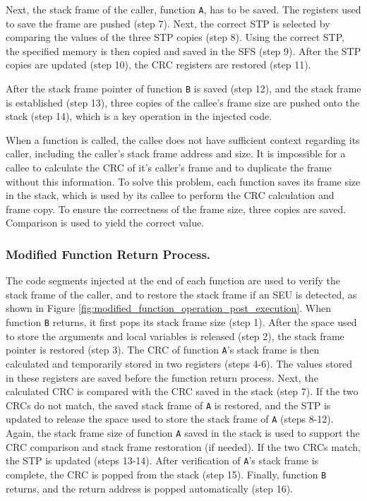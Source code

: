 Next, the stack frame of the caller, function \texttt{A}, has to be saved. The registers used to save the frame are pushed (step 7). Next, the correct STP is selected by comparing the values of the three STP copies (step 8). Using the correct STP, the specified memory is then copied and saved in the SFS (step 9). After the STP copies are updated (step 10), the CRC registers are restored (step 11).

After the stack frame pointer of function \texttt{B} is saved (step 12), and the stack frame is established (step 13), three copies of the callee's frame size are pushed onto the stack (step 14), which is a key operation in the injected code. 

When a function is called, the callee does not have sufficient context regarding its caller, including the caller's stack frame address and size. It is impossible for a callee to calculate the CRC of it's caller's frame and to duplicate the frame without this information. To solve this problem, each function saves its frame size in the stack, which is used by its callee to perform the CRC calculation and frame copy. To ensure the correctness of the frame size, three copies are saved. Comparison is used to yield the correct value. 
\vspace{-15pt}
\subsubsection{Modified Function Return Process.}
The code segments injected at the end of each function are used to verify the stack frame of the caller, and to restore the stack frame if an SEU is detected, as shown in Figure \ref{fig:modified_function_operation_post_execution}. When function \texttt{B} returns, it first pops its stack frame size (step 1). After the space used to store the arguments and local variables is released (step 2), the stack frame pointer is restored (step 3). The CRC of function \texttt{A}'s stack frame is then calculated and temporarily stored in two registers (steps 4-6). The values stored in these registers are saved before the function return process. Next, the calculated CRC is compared with the CRC saved in the stack (step 7). If the two CRCs do not match, the saved stack frame of \texttt{A} is restored, and the STP is updated to release the space used to store the stack frame of \texttt{A} (steps 8-12). Again, the stack frame size of function \texttt{A} saved in the stack is used to support the CRC comparison and stack frame restoration (if needed). If the two CRCs match, the STP is updated (steps 13-14). After verification of \texttt{A}'s stack frame is complete, the CRC is popped from the stack (step 15). Finally, function \texttt{B} returns, and the return address is popped automatically (step 16).